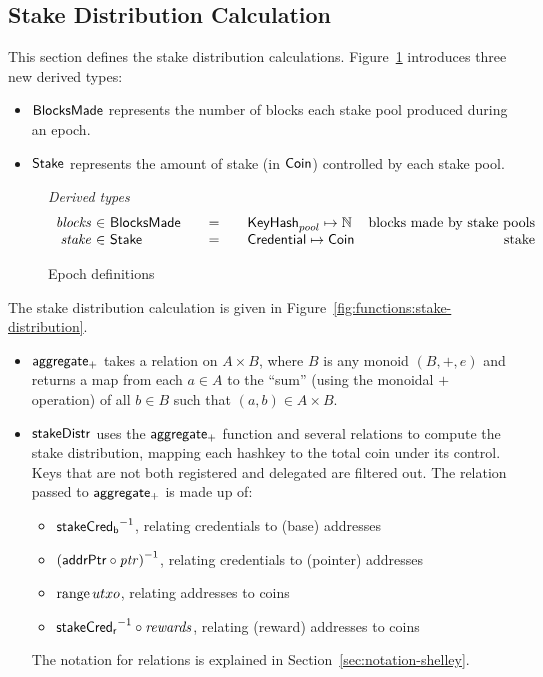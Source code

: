 \subsection{Stake Distribution Calculation}
\label{sec:stake-dist-calc}

This section defines the stake distribution calculations.
Figure~\ref{fig:epoch-defs} introduces three new derived types:
\begin{itemize}
  \item $\mathsf{BlocksMade}$ represents the number of blocks each stake pool produced
    during an epoch.
  \item $\mathsf{Stake}$ represents the amount of stake (in $\mathsf{Coin}$) controlled by each
    stake pool.
\end{itemize}

\begin{figure}[htb]
  \emph{Derived types}
  \begin{equation*}
    \begin{array}{r@{~\in~}l@{\qquad=\qquad}lr}
      \var{blocks}
      & \BlocksMade
      & \KeyHash_{pool} \mapsto \N
      & \text{blocks made by stake pools} \\
      \var{stake}
      & \Stake
      & \Credential \mapsto \Coin
      & \text{stake} \\
    \end{array}
  \end{equation*}
  \caption{Epoch definitions}
  \label{fig:epoch-defs}
\end{figure}

The stake distribution calculation is given in Figure~\ref{fig:functions:stake-distribution}.

\begin{itemize}
\item $\mathsf{aggregate_{+}}$ takes a relation on $A\times B$, where $B$ is any
  monoid $(B,+,e)$ and returns a map from each $a\in A$ to the ``sum'' (using
  the monoidal $+$ operation) of all $b\in B$ such that $(a, b)\in A\times B$.
\item $\mathsf{stakeDistr}$ uses the $\mathsf{aggregate_{+}}$ function and several relations to
    compute the stake distribution, mapping each hashkey to the total coin under its control.
    Keys that are not both registered and delegated are filtered out.
    The relation passed to $\mathsf{aggregate_{+}}$ is made up of:
    \begin{itemize}
      \item $\mathsf{stakeCred_b}^{-1}$, relating credentials to (base) addresses
      \item $\left(\mathsf{addrPtr}\circ\mathit{ptr}\right)^{-1}$, relating credentials to (pointer)
        addresses
      \item $\operatorname{range}{utxo}$, relating addresses to coins
      \item $\mathsf{stakeCred_r}^{-1}\circ\mathit{rewards}$, relating (reward) addresses to coins
    \end{itemize}
    The notation for relations is explained in Section~\ref{sec:notation-shelley}.
\end{itemize}

